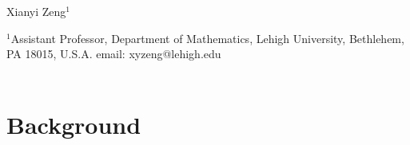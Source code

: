 \documentclass[12pt,letterpaper]{article}
\begin{document}
\normalsize
\begin{center}
Xianyi Zeng$^1$\\
\end{center}
$^1$Assistant Professor, Department of Mathematics, Lehigh University, Bethlehem, PA 18015, U.S.A. email: xyzeng@lehigh.edu\\
\\
\setcounter{tocdepth}{3}
\tableofcontents

\newpage

\section{Background}
\label{sec:bg}

\end{document}
